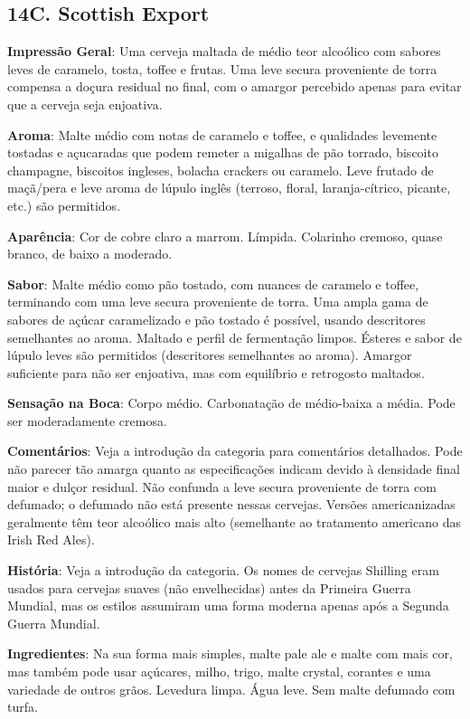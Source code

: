 \subsection*{14C. Scottish Export}
\textbf{Impressão Geral}: Uma cerveja maltada de médio teor alcoólico com sabores leves de caramelo, tosta, toffee e frutas. Uma leve secura proveniente de torra compensa a doçura residual no final, com o amargor percebido apenas para evitar que a cerveja seja enjoativa.

\textbf{Aroma}: Malte médio com notas de caramelo e toffee, e qualidades levemente tostadas e açucaradas que podem remeter a migalhas de pão torrado, biscoito champagne, biscoitos ingleses, bolacha crackers ou caramelo. Leve frutado de maçã/pera e leve aroma de lúpulo inglês (terroso, floral, laranja-cítrico, picante, etc.) são permitidos.

\textbf{Aparência}: Cor de cobre claro a marrom. Límpida. Colarinho cremoso, quase branco, de baixo a moderado.

\textbf{Sabor}: Malte médio como pão tostado, com nuances de caramelo e toffee, terminando com uma leve secura proveniente de torra. Uma ampla gama de sabores de açúcar caramelizado e pão tostado é possível, usando descritores semelhantes ao aroma. Maltado e perfil de fermentação limpos. Ésteres e sabor de lúpulo leves são permitidos (descritores semelhantes ao aroma). Amargor suficiente para não ser enjoativa, mas com equilíbrio e retrogosto maltados.

\textbf{Sensação na Boca}: Corpo médio. Carbonatação de médio-baixa a média. Pode ser moderadamente cremosa.

\textbf{Comentários}:  Veja a introdução da categoria para comentários detalhados. Pode não parecer tão amarga quanto as especificações indicam devido à densidade final maior e dulçor residual. Não confunda  a leve secura proveniente de torra com defumado; o defumado não está presente nessas cervejas. Versões americanizadas geralmente têm teor alcoólico mais alto (semelhante ao tratamento americano das Irish Red Ales).

\textbf{História}: Veja a introdução da categoria. Os nomes de cervejas Shilling eram usados para cervejas suaves (não envelhecidas) antes da Primeira Guerra Mundial, mas os estilos assumiram uma forma moderna apenas após a Segunda Guerra Mundial.

\textbf{Ingredientes}: Na sua forma mais simples, malte pale ale e malte com mais cor, mas também pode usar açúcares, milho, trigo, malte crystal, corantes e uma variedade de outros grãos. Levedura limpa. Água leve. Sem malte defumado com turfa.

